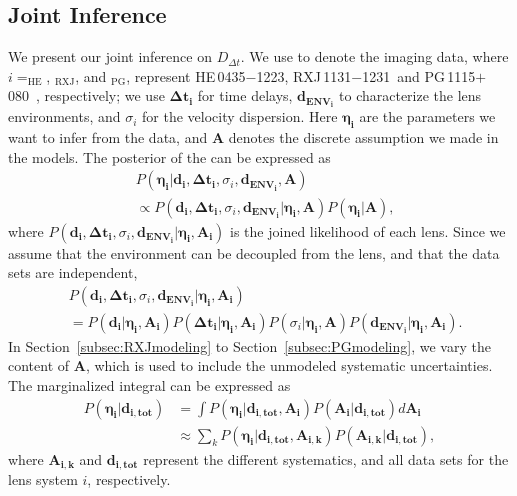 \documentclass[useAMS,usenatbib]{mnras}
\newcommand\rxj{RXJ\,1131$-$1231}
\newcommand\he{HE\,0435$-$1223}
\newcommand\pg{PG\,1115$+$080}
\newcommand{\sref}[1]{Section~\ref{#1}}
\newcommand{\Ddt}{D_{\Delta t}}
\begin{document}
\subsection{Joint Inference}
\label{sec:Jointinfer}
We present our joint inference on $\Ddt$.
We use  to denote
the imaging data, where $i= _{\textrm{HE}}$, $_{\textrm{RXJ}}$, and $_{\textrm{PG}}$, represent \he, \rxj\, and \pg\ , respectively; we use $\bm{\Delta t_{i}}$ for time delays, $\bm{d_{\textrm{ENV}_{i}}}$ to characterize the lens environments, and $\sigma_{i}$ for the velocity dispersion. Here $\bm{\eta_{i}}$ are the parameters we want to infer from the data, and $\bm{A}$ denotes the discrete assumption we made in the models.
The posterior of the  can be expressed as
\begin{equation}
\begin{split}
&P(\bm{\eta_{i}}|\bm{d_{i}},\bm{\Delta t_{i}},\sigma_{i}, \bm{d_{\textrm{ENV}_{i}}}, \bm{A}) \\
&\propto P(\bm{d_{i}},\bm{\Delta t_{i}},\sigma_{i}, \bm{d_{\textrm{ENV}_{i}}}|\bm{\eta_{i}},\bm{A})P(\bm{\eta_{i}}|\bm{A}), 
\end{split}
\end{equation}
where $P(\bm{d_{i}},\bm{\Delta t_{i}},\sigma_{i}, \bm{d_{\textrm{ENV}_{i}}}|\bm{\eta_{i}},\bm{A_{i}})$ is the joined likelihood of each lens. Since we assume that the environment can be decoupled from the lens, and that the data sets are independent, 
\begin{equation}
\begin{split}
&P(\bm{d_{i}},\bm{\Delta t_{i}},\sigma_{i}, \bm{d_{\textrm{ENV}_{i}}}|\bm{\eta_{i}},\bm{A_{i}}) \\
&=P(\bm{d_{i}}|\bm{\eta_{i}},\bm{A_{i}})P(\bm{\Delta t_{i}}|\bm{\eta_{i}},\bm{A_{i}})P(\sigma_{i}|\bm{\eta_{i}},\bm{A})P(\bm{d_{\textrm{ENV}_{i}}}|\bm{\eta_{i}},\bm{A_{i}}).
\end{split}
\end{equation}
In \sref{subsec:RXJmodeling} to \sref{subsec:PGmodeling}, we vary the content of $\bm{A}$, which is used to include the unmodeled systematic uncertainties. The marginalized integral can be expressed as
\begin{equation}
\begin{split}
P(\bm{\eta_{i}}|\bm{d_{i,tot}})&=\int P(\bm{\eta_{i}}|\bm{d_{i,\textrm{tot}}},\bm{A_{i}})P(\bm{A_{i}}|\bm{d_{i,\textrm{tot}}})d\bm{A_{i}} \\
&\approx \sum_{k}P(\bm{\eta_{i}}|\bm{d_{i,\textrm{tot}}},\bm{A_{i,k}})P(\bm{A_{i,k}}|\bm{d_{i,\textrm{tot}}}),
\end{split}
\end{equation}
where $\bm{A_{i,k}}$ and $\bm{d_{i,\textrm{tot}}}$ represent the different systematics, and all data sets for the lens system $i$, respectively.
\end{document}
